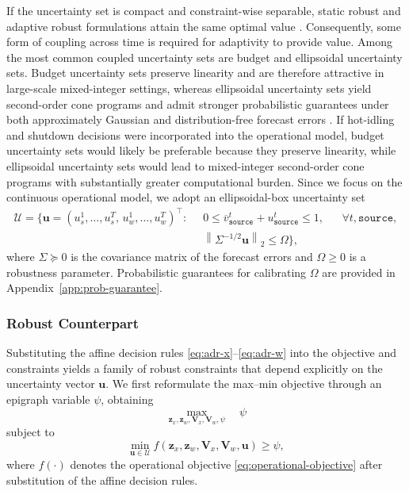 \documentclass[11pt, letter]{article}
\begin{document}
If the uncertainty set is compact and constraint-wise separable, static robust and adaptive robust formulations attain the same optimal value \citep{marandi_when_2018}. Consequently, some form of coupling across time is required for adaptivity to provide value. Among the most common coupled uncertainty sets are budget and ellipsoidal uncertainty sets. Budget uncertainty sets preserve linearity and are therefore attractive in large-scale mixed-integer settings, whereas ellipsoidal uncertainty sets yield second-order cone programs and admit stronger probabilistic guarantees under both approximately Gaussian and distribution-free forecast errors \citep{bertsimas_probabilistic_2021}. If hot-idling and shutdown decisions were incorporated into the operational model, budget uncertainty sets would likely be preferable because they preserve linearity, while ellipsoidal uncertainty sets would lead to mixed-integer second-order cone programs with substantially greater computational burden. Since we focus on the continuous operational model, we adopt an ellipsoidal-box uncertainty set
\begin{subequations}\label{eq:operational-uset}
\begin{align}
\mathcal{U}
=
\Big\{
\boldsymbol{u}
=
(u_s^1,\ldots,u_s^T,\,
u_w^1,\ldots,u_w^T)^\top
:\;
&\;
0
\le
\overline{v}_{\texttt{source}}^t
+
u_{\texttt{source}}^t
\le
1,
&&
\forall t,\texttt{source},
\label{eq:uset-capacity-bound}
\\
&\;
\left\|
\Sigma^{-1/2}\boldsymbol{u}
\right\|_2
\le
\Omega
\Big\},
\label{eq:uset-ellipsoid}
\end{align}
\end{subequations}
where $\Sigma \succeq 0$ is the covariance matrix of the forecast errors and $\Omega \ge 0$ is a robustness parameter. Probabilistic guarantees for calibrating $\Omega$ are provided in Appendix~\ref{app:prob-guarantee}.
\subsubsection{Robust Counterpart}

Substituting the affine decision rules \eqref{eq:adr-x}--\eqref{eq:adr-w}
into the objective and constraints yields a family of robust constraints
that depend explicitly on the uncertainty vector $\boldsymbol{u}$.
We first reformulate the max--min objective through an epigraph variable
$\psi$, obtaining
\[
\max_{\boldsymbol{z}_x,\boldsymbol{z}_w,
      \boldsymbol{V}_x,\boldsymbol{V}_w,\psi}
\quad \psi
\]
subject to
\begin{equation}\label{eq:operational-epigraph}
\min_{\boldsymbol{u}\in\mathcal U}
f(\boldsymbol{z}_x,\boldsymbol{z}_w,
  \boldsymbol{V}_x,\boldsymbol{V}_w,\boldsymbol{u})
\ge \psi,
\end{equation}
where $f(\cdot)$ denotes the operational objective
\eqref{eq:operational-objective} after substitution of the affine decision
rules.
\end{document}
